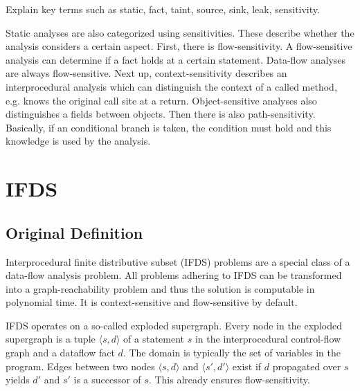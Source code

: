 \documentclass[../draft.tex]{subfiles}
\begin{document}
    Explain key terms such as static, fact, taint, source, sink, leak, sensitivity.
    
    Static analyses are also categorized using sensitivities. These describe whether the analysis considers a certain aspect.
    First, there is flow-sensitivity. A flow-sensitive analysis can determine if a fact holds at a certain statement. Data-flow analyses are always flow-sensitive.
    Next up, context-sensitivity describes an interprocedural analysis which can distinguish the context of a called method, e.g. knows the original call site at a return.
    Object-sensitive analyses also distinguishes a fields between objects.
    Then there is also path-sensitivity. Basically, if an conditional branch is taken, the condition must hold and this knowledge is used by the analysis.

    \section{IFDS}
    \subsection{Original Definition}
    Interprocedural finite distributive subset (IFDS) problems are a special class of a data-flow analysis problem. All problems adhering to IFDS can be transformed into a graph-reachability problem and thus the solution is computable in polynomial time. It is context-sensitive and flow-sensitive by default.

    IFDS operates on a so-called exploded supergraph. Every node in the exploded supergraph is a tuple $\langle s, d \rangle$ of a statement $s$ in the interprocedural control-flow graph and a dataflow fact $d$. The domain is typically the set of variables in the program. Edges between two nodes $\langle s, d \rangle$ and $\langle s', d' \rangle$ exist if $d$ propagated over $s$ yields $d'$ and $s'$ is a successor of $s$. This already ensures flow-sensitivity.
\end{document}
